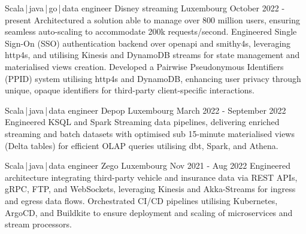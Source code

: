 
\newcommand*{\logo}[2]{\raisebox{-0.2em}{\texttt{[image: \#2]}}\hspace{0.25em}#1}
\newcommand*{\logoonly}[1]{\raisebox{-0.2em}{\texttt{[image: \#1]}}}


\begin{cventries}
  \cventry
    {Scala\,|\,java\,|\,go\,|\,data engineer}
    {\logo{Disney streaming}{../../../images/disney.png}} %
    {Luxembourg} %
    {October 2022 - present} %
    {
      Architectured a solution able to manage over 800 million users, ensuring seamless auto-scaling to accommodate 200k requests/second. Engineered Single Sign-On (SSO) authentication backend over openapi and smithy4s, leveraging http4s, and utilising Kinesis and DynamoDB streams for state management and materialised views creation. 
      \newline
      Developed a Pairwise Pseudonymous Identifiers (PPID) system utilising http4s and DynamoDB, enhancing user privacy through unique, opaque identifiers for third-party client-specific interactions.
    }

  \cventry
    {Scala\,|\,java\,|\,data engineer}
    {\logo{Depop}{../../../images/depop.jpg}} %
    {Luxembourg} %
    {March 2022 - September 2022} %
    {
       Engineered KSQL and Spark Streaming data pipelines, delivering enriched streaming and batch datasets with optimised sub 15-minute materialised views (Delta tables) for efficient OLAP queries utilising dbt, Spark, and Athena.
    }


  \cventry
    {Scala\,|\,java\,|\,data engineer}
    {\logo{Zego}{../../../images/zego.jpg}} %
    {Luxembourg} %
    {Nov 2021 - Aug 2022} %
    {
     Engineered architecture integrating third-party vehicle and insurance data via REST APIs, gRPC, FTP, and WebSockets, leveraging Kinesis and Akka-Streams for ingress and egress data flows. Orchestrated CI/CD pipelines utilising Kubernetes, ArgoCD, and Buildkite to ensure deployment and scaling of microservices and stream processors.
    }


\end{cventries}
